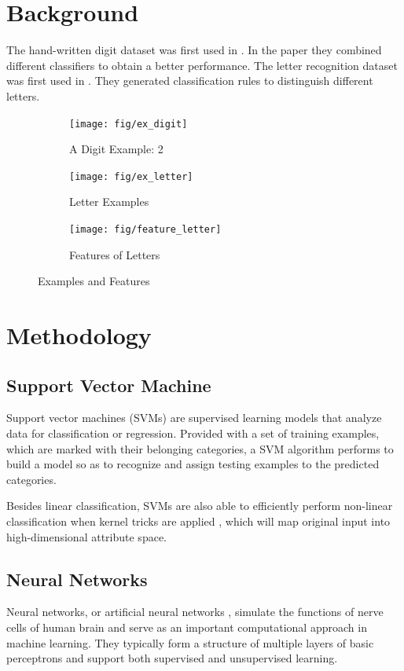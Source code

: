 \documentclass[11pt]{article}
\begin{document}
\section{Background}
The hand-written digit dataset was first used in \cite{kaynak1995methods}. In the paper they combined different classifiers to obtain a better performance.  The letter recognition dataset was first used in \cite{frey1991letter}. They generated classification rules to distinguish different letters.

\begin{figure}[htbp]
\centering

\begin{subfigure}[htbp]{0.32\columnwidth}
\texttt{[image: fig/ex\_digit]}
\caption{A Digit Example: 2}
\label{fig:ex:digit}
\end{subfigure}
\hfill
\begin{subfigure}[htbp]{0.32\columnwidth}
\texttt{[image: fig/ex\_letter]}
\caption{Letter Examples}
\label{fig:ex:letter}
\end{subfigure}
\hfill
\begin{subfigure}[htbp]{0.32\columnwidth}
\texttt{[image: fig/feature\_letter]}
\caption{Features of Letters}
\label{fig:feature:letter}
\end{subfigure}
\caption{Examples and Features}
\end{figure}

\section{Methodology}\label{sec:metho}

\subsection{Support Vector Machine}
Support vector machines (SVMs) \cite{cortes1995support} are supervised learning models that analyze data for classification or regression. Provided with a set of training examples, which are marked with their belonging categories, a SVM algorithm performs to build a model so as to recognize and assign testing examples to the predicted categories. 

Besides linear classification, SVMs are also able to efficiently perform non-linear classification when kernel tricks are applied\cite{boser1992training} , which will map original input into high-dimensional attribute space.

\subsection{Neural Networks}
Neural networks, or artificial neural networks \cite{hagan1996neural}, simulate the functions of nerve cells of human brain and serve as an important computational approach in machine learning. They typically form a structure of multiple layers of basic perceptrons and support both supervised and unsupervised learning.
\end{document}
